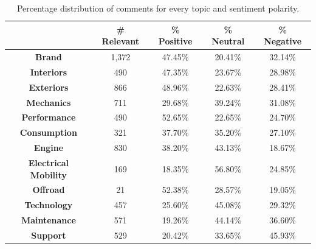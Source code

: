 \begin{table}[ht]
	\renewcommand{\arraystretch}{1.3}
	\centering
	\begin{tabular}{| c | c | c | c | c |} 
		\hline
		& \textbf{\# Relevant} & \textbf{\% Positive} & \textbf{\% Neutral} & \textbf{\% Negative} \\ [.06cm]
		\hline
		\hline
		\textbf{Brand}& 1,372 & 47.45\% & 20.41\% & 32.14\% \\ %
		\hline
		\textbf{Interiors}& 490 & 47.35\% & 23.67\% & 28.98\% \\ %
		\hline
		\textbf{Exteriors}& 866 & 48.96\% & 22.63\% & 28.41\%  \\%
		\hline
		\textbf{Mechanics}& 711 & 29.68\% & 39.24\% & 31.08\% \\ %
		\hline
		\textbf{Performance}& 490 & 52.65\% & 22.65\% & 24.70\% \\ %
		\hline
		\textbf{Consumption}& 321 & 37.70\% & 35.20\% & 27.10\% \\ %
		\hline
		\textbf{Engine}& 830 & 38.20\% & 43.13\% & 18.67\% \\ %
		\hline
		\textbf{Electrical Mobility}& 169 & 18.35\% & 56.80\% & 24.85\% \\%
		\hline
		\textbf{Offroad}& 21 & 52.38\% & 28.57\% & 19.05\% \\ %
		\hline
		\textbf{Technology}& 457 & 25.60\% & 45.08\% & 29.32\% \\ %
		\hline
		\textbf{Maintenance}& 571 & 19.26\% & 44.14\% & 36.60\% \\ %
		\hline
		\textbf{Support}& 529 & 20.42\% & 33.65\% & 45.93\% \\ %
		\hline
		
	\end{tabular}
	\caption{Percentage distribution of comments for every topic and sentiment polarity.}
	\label{table:annotations-distribution-perc-rel}
\end{table}


